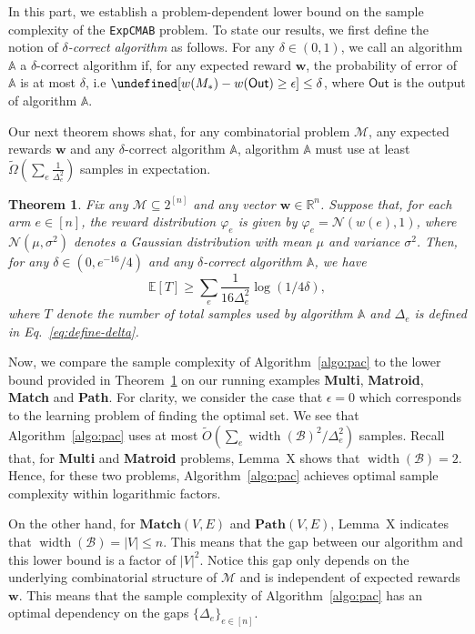 \documentclass{article}
\newtheorem{theorem}{Theorem}
\newcommand{\Problem}{\texttt{ExpCMAB}\xspace}
\newcommand{\Rew}{\varphi}
\newcommand{\E}{\mathbb E}
\newcommand{\M}{\mathcal M}
\newcommand{\B}{\mathcal B}
\newcommand{\RR}{\mathbb R}
\DeclareMathOperator{\rank}{width}
\newcommand{\out}{\mathsf{Out}}
\let\Pr\undefined
\DeclareMathOperator{\Pr}{Pr}
\newcommand{\MultiIdent}{\textbf{Multi}\xspace}
\newcommand{\Matroid}{\textbf{Matroid}\xspace}
\newcommand{\Match}{\textbf{Match}\xspace}
\newcommand{\Path}{\textbf{Path}\xspace}
\renewcommand{\vec}[1]{\boldsymbol{#1}}
\begin{document}
\begin{spacing}{1.1}
In this part, we establish a problem-dependent lower bound on the sample complexity of the \Problem problem. 
To state our results, we first define the notion of \emph{$\delta$-correct algorithm} as follows.
For any $\delta \in (0,1)$, we call an algorithm $\mathbb A$ a $\delta$-correct algorithm if, for any expected reward $\vec w$, the probability of error of $\mathbb A$ is at most $\delta$, i.e $\Pr[w(M_*)-w(\out) \ge \epsilon] \le \delta$, where $\out$ is the output of algorithm $\mathbb A$.

Our next theorem shows shat, for any combinatorial problem $\M$, any expected rewards $\vec w$ and any $\delta$-correct algorithm $\mathbb A$, algorithm $\mathbb A$ must use at least $\tilde\Omega\left(\sum_{e} \frac{1}{\Delta_e^2}\right)$ samples in expectation.

\begin{theorem}
Fix any $\M\subseteq 2^{[n]}$ and any vector $\vec w \in \RR^n$.
Suppose that, for each arm $e\in [n]$, the reward distribution $\Rew_e$ is given by $\Rew_e=\mathcal N(w(e),1)$, where $\mathcal N(\mu, \sigma^2)$ denotes a Gaussian distribution with mean $\mu$ and variance $\sigma^2$. 
Then, for any $\delta \in (0,e^{-16}/4)$ and any $\delta$-correct algorithm $\mathbb A$, we have
$$
\E[T] \ge \sum_e \frac{1}{16\Delta_e^2}\log(1/4\delta),
$$
where 
$T$ denote the number of total samples used by algorithm $\mathbb A$ and
$\Delta_e$ is defined in Eq.~\eqref{eq:define-delta}.
\label{theorem:lower-bound}
\end{theorem}

Now, we compare the sample complexity of Algorithm~\ref{algo:pac} to the lower bound provided in Theorem~\ref{theorem:lower-bound} on our running examples \MultiIdent, \Matroid, \Match and \Path.
For clarity, we consider the case that $\epsilon=0$ which corresponds to the learning problem of finding the optimal set.
We see that Algorithm~\ref{algo:pac} uses at most $\tilde O(\sum_{e} \rank(\B)^2/\Delta_e^2)$ samples.
Recall that, for \MultiIdent and \Matroid problems, Lemma~X shows that $\rank(\B)=2$.
Hence, for these two problems, Algorithm~\ref{algo:pac} achieves optimal sample complexity within logarithmic factors.

On the other hand, for $\Match(V,E)$ and $\Path(V,E)$, Lemma~X indicates that $\rank(\B)=|V| \le n$.
This means that the gap between our algorithm and this lower bound is a factor of $|V|^2$.
Notice this gap only depends on the underlying combinatorial structure of $\M$ and is independent of expected rewards $\vec w$. 
This means that  the sample complexity of Algorithm~\ref{algo:pac} has an optimal dependency on the gaps $\{\Delta_e\}_{e\in[n]}$.


\end{spacing}
\end{document}
